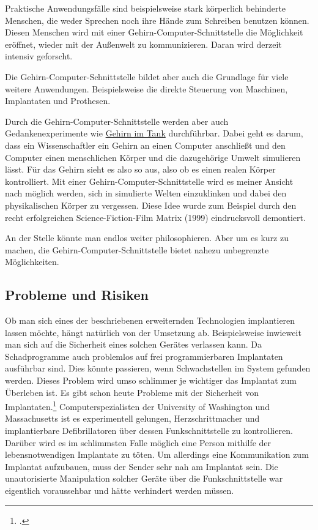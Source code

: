 Praktische Anwendungsfälle sind beispielsweise stark körperlich behinderte Menschen, die weder
Sprechen noch ihre Hände zum Schreiben benutzen können. Diesen Menschen wird mit einer
Gehirn-Computer-Schnittstelle die Möglichkeit eröffnet, wieder mit der Außenwelt zu kommunizieren.
Daran wird derzeit intensiv geforscht.

Die Gehirn-Computer-Schnittstelle bildet aber auch die Grundlage für viele weitere Anwendungen.
Beispielsweise die direkte Steuerung von Maschinen, Implantaten und Prothesen.

Durch die Gehirn-Computer-Schnittstelle werden aber auch Gedankenexperimente wie
\href{http://de.wikipedia.org/wiki/Gehirn_im_Tank}{Gehirn im Tank} durchführbar. Dabei geht es darum,
dass ein Wissenschaftler ein Gehirn an einen Computer anschließt und den Computer einen menschlichen
Körper und die dazugehörige Umwelt simulieren lässt. Für das Gehirn sieht es also so aus, also ob es
einen realen Körper kontrolliert. Mit einer Gehirn-Computer-Schnittstelle wird es meiner Ansicht nach
möglich werden, sich in simulierte Welten einzuklinken und dabei den physikalischen Körper zu
vergessen. Diese Idee wurde zum Beispiel durch den recht erfolgreichen Science-Fiction-Film Matrix
(1999) eindrucksvoll demontiert.

An der Stelle könnte man endlos weiter philosophieren. Aber um es kurz zu machen, die
Gehirn-Computer-Schnittstelle bietet nahezu unbegrenzte Möglichkeiten.

\subsection{Probleme und Risiken}
\label{sec:Robin:future:problems}
Ob man sich eines der beschriebenen erweiternden Technologien implantieren lassen möchte, hängt
natürlich von der Umsetzung ab. Beispielsweise inwieweit man sich auf die Sicherheit eines solchen
Gerätes verlassen kann. Da Schadprogramme auch problemlos auf frei programmierbaren Implantaten
ausführbar sind. Dies könnte passieren, wenn Schwachstellen im System gefunden werden. Dieses Problem
wird umso schlimmer je wichtiger das Implantat zum Überleben ist. Es gibt schon heute Probleme mit
der Sicherheit von Implantaten.\footcite{Heise:Pacemaker_Hacker, MIT:Protect_implants_from_attack}
Computerspezialisten der University of Washington und Massachusetts ist es experimentell gelungen,
Herzschrittmacher und implantierbare Defibrillatoren über dessen Funkschnittstelle zu kontrollieren.
Darüber wird es im schlimmsten Falle möglich eine Person mithilfe der lebensnotwendigen Implantate zu
töten. Um allerdings eine Kommunikation zum Implantat aufzubauen, muss der Sender sehr nah am
Implantat sein.
Die unautorisierte Manipulation solcher Geräte über die Funkschnittstelle war eigentlich voraussehbar
und hätte verhindert werden müssen.

